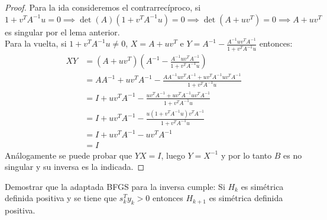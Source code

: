 \documentclass{article}
\newenvironment{theorem}[2][Ejercicio]{\begin{trivlist}
\item[\hskip \labelsep {\bfseries #1}\hskip \labelsep {\bfseries #2.}]}{\end{trivlist}}
\begin{document}
\begin{proof}
    Para la ida consideremos el contrarrecíproco, si \( 1 + v^T A^{-1} u = 0 \implies \det(A) ( 1 + v^T A^{-1} u) = 0 \implies \det(A + u v^T) = 0 \implies A + u v^T \) es singular por el lema anterior. \\
    Para la vuelta, si \( 1 + v^T A^{-1} u \neq 0 \), \( X = A + uv^T \) e \( Y = A^{-1} - \frac{A^{-1}u v^T A^{-1}}{1+v^T A^{-1}u} \) entonces: \begin{align*}
        XY & = \left(A + uv^T\right) \left( A^{-1} - \frac{A^{-1}u v^T A^{-1}}{1+v^T A^{-1}u} \right)               \\
           & = A A^{-1} + u v^T A^{-1} - \frac{A A^{-1} u v^T A^{-1} + u v^T A^{-1} u v^T A^{-1}}{1 + v^T A^{-1} u} \\
           & = I + u v^T A^{-1} - \frac{u v^T A^{-1} + u v^T A^{-1} u v^T A^{-1}}{1 + v^T A^{-1} u}                 \\
           & = I + u v^T A^{-1} - \frac{u \left(1 + v^T A^{-1} u \right) v^T A^{-1}}{1 + v^T A^{-1} u}              \\
           & = I + u v^T A^{-1} - u v^T A^{-1}                                                                      \\
           & = I
    \end{align*}
    Análogamente se puede probar que \( YX = I \), luego \( Y = X^{-1} \) y por lo tanto \( B \) es no singular y su inversa es la indicada.
\end{proof}
\vspace{0.25in}

\begin{theorem}{8}
    Demostrar que la adaptada BFGS para la inversa cumple:
    Si \(H_k\) es simétrica definida positiva y se tiene que \(s_k^T y_k > 0\)
    entonces \(H_{k+1}\) es simétrica definida positiva.
\end{theorem}
\end{document}
